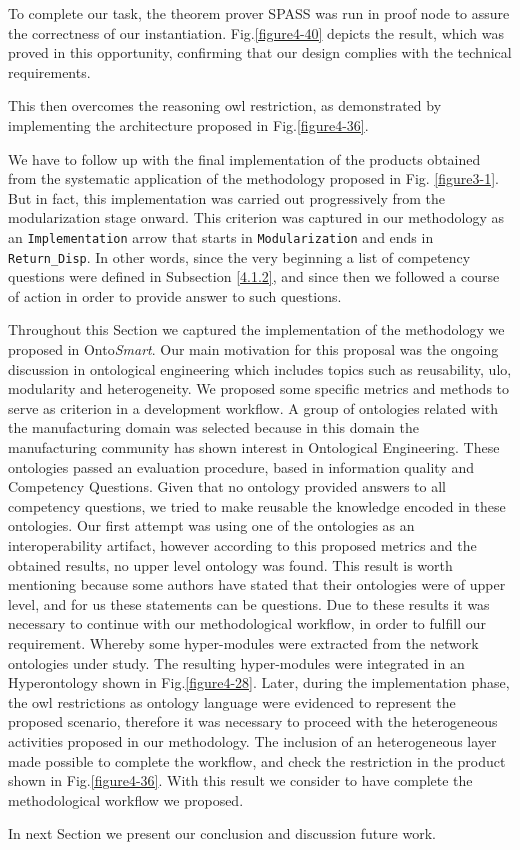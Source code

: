 To complete our task, the theorem prover SPASS \cite{weidenbach_chapter_2001} was run in proof node to assure the correctness of our instantiation. Fig.\ref{figure4-40} depicts the result, which was proved in this opportunity, confirming that our design complies with the technical requirements.





This then overcomes the reasoning \gls{owl} restriction, as demonstrated by implementing the architecture proposed in Fig.\ref{figure4-36}.

We have to follow up with the final implementation of the products obtained from the systematic application of the methodology proposed in Fig. \ref{figure3-1}. But in fact, this implementation was carried out progressively from the modularization stage onward. This criterion was captured in our methodology as an \texttt{Implementation} arrow that starts in \texttt{Modularization} and ends in \texttt{Return\_Disp}. In other words, since the very beginning a list of competency questions were defined in Subsection \ref{4.1.2}, and since then we followed a course of action in order to provide answer to such questions. 


Throughout this Section we captured the implementation of the methodology we proposed in Onto\textit{Smart}. Our main motivation for this proposal was the ongoing discussion in ontological engineering which includes topics such as reusability, \gls{ulo}, modularity and heterogeneity. We proposed some specific metrics and methods to serve as criterion in a development workflow. A group of ontologies related with the manufacturing domain was selected because in this domain the manufacturing community has shown interest in Ontological Engineering.  These ontologies passed an evaluation procedure, based in information quality and Competency Questions. Given that no ontology provided answers to all competency questions, we tried to make reusable the knowledge encoded in these ontologies. Our first attempt was using one of the ontologies as an interoperability artifact, however according to this proposed metrics and the obtained results, no upper level ontology was found. This result is worth mentioning because some authors have stated that their ontologies were of upper level, and for us these statements can be questions. Due to these results it was necessary to continue with our methodological workflow, in order to  fulfill our requirement. Whereby some hyper-modules were extracted from the network ontologies under study. The resulting hyper-modules were integrated in an Hyperontology shown in Fig.\ref{figure4-28}. Later, during the implementation phase, the \gls{owl} restrictions as ontology language were evidenced to represent the proposed scenario, therefore it was necessary to proceed with the heterogeneous activities proposed in our methodology. The inclusion of an heterogeneous layer made possible to complete the workflow, and check the restriction in the product shown in Fig.\ref{figure4-36}. With this result we consider to have complete the methodological workflow we proposed.

In next Section we present our conclusion and discussion future work.















